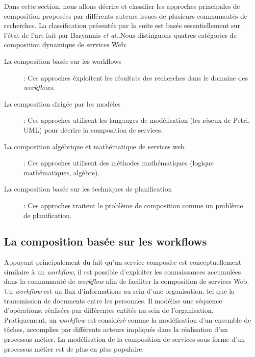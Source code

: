   Dans cette section, nous allons décrire et classifier les approches
  principales de composition proposées par différents auteurs issues
  de plusieurs communautés de recherches. La classification présentée
  par la suite est basée essentiellement sur l'état de l'art fait par
  Baryannis \emph{et al.}\cite{baryannis2010}.Nous distinguons quatres
  catégories de composition dynamique de services Web:

  \renewcommand{\descriptionlabel}[1]{\hspace{0.5cm}\textbullet~\textsf{#1}}
  \begin{description}
  \item[La composition basée sur les workflows]: Ces approches
    éxploitent les résultats des recherches dans le domaine des
    \textit{workflows}.

  \item[La composition dirigée par les modèles]: Ces approches
    utilisent les languages de modélisation (les réseux de Petri,
    \textsc{UML}) pour décrire la composition de services.

  \item[La composition algébrique et mathématique de services web]:
    Ces approches utilisent des méthodes mathématiques (logique
    mathématiques, algèbre).

  \item[La composition basée sur les techniques de planification]: Ces
    approches traitent le problème de composition comme un problème de
    planification.
  \end{description}
  \enddescription

  \subsection{La composition  basée sur les workflows}
  \label{sec:les-approches-basees}
  Appuyant principalement du fait qu'un service composite est
  conceptuellement similaire à un \textit{workflow}, il est possible
  d'exploiter les connaissances accumulées dans la communauté de
  \textit{workflow} afin de faciliter la composition de services
  Web. Un \textit{workflow} est un flux d'informations au sein d'une
  organisation, tel que la transmission de documents entre les
  personnes. Il modélise une séquence d'opérations, réalisées par
  différentes entités au sein de l'organisation. Pratiquement, un
  \textit{workflow} est considéré comme la modélisation d'un ensemble
  de tâches, accomplies par différents acteurs impliqués dans la
  réalisation d'un processus métier. La modélisation de la composition
  de services sous forme d'un processus métier est de plus en plus
  populaire.\medskip

